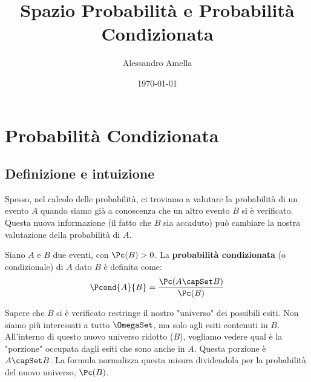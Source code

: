 

\title{Spazio Probabilità e Probabilità Condizionata}
\author{Alessandro Amella}
\date{\today}



\maketitle
\tableofcontents
\newpage

\section{Probabilità Condizionata}

\subsection{Definizione e intuizione}

Spesso, nel calcolo delle probabilità, ci troviamo a valutare la probabilità di un evento $A$ quando siamo già a conoscenza che un altro evento $B$ si è verificato. Questa nuova informazione (il fatto che $B$ sia accaduto) può cambiare la nostra valutazione della probabilità di $A$.

\begin{definition}
Siano $A$ e $B$ due eventi, con $\Pc(B) > 0$. La \textbf{probabilità condizionata} (o condizionale) di $A$ dato $B$ è definita come:
\[ \Pcond{A}{B} = \frac{\Pc(A \capSet B)}{\Pc(B)} \]
\end{definition}

\begin{remark}
Sapere che $B$ si è verificato restringe il nostro "universo" dei possibili esiti. Non siamo più interessati a tutto $\OmegaSet$, ma solo agli esiti contenuti in $B$. All'interno di questo nuovo universo ridotto ($B$), vogliamo vedere qual è la "porzione" occupata dagli esiti che sono anche in $A$. Questa porzione è $A \capSet B$. La formula normalizza questa misura dividendola per la probabilità del nuovo universo, $\Pc(B)$.
\end{remark}

